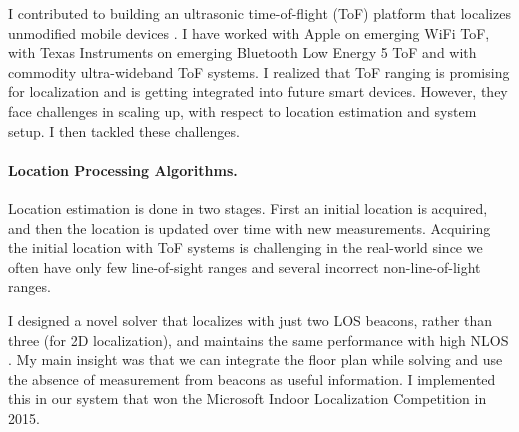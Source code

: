 \documentclass[10pt]{article}
\begin{document}
I contributed to building an ultrasonic time-of-flight (ToF) platform that localizes unmodified mobile devices \cite{rtas-alps-platform, lazik2015alps,lazik2015alpsdemo}.  I have worked with Apple on emerging WiFi ToF, with Texas Instruments on emerging Bluetooth Low Energy 5 ToF and with commodity ultra-wideband ToF systems. I realized that ToF ranging is promising for localization and is getting integrated into future smart devices.  However, they face challenges in scaling up, with respect to location estimation and system setup. I then tackled these challenges. %

\paragraph{Location Processing Algorithms.  } 
Location estimation is done in two stages. First an initial location is acquired, and then the location is updated over time with new measurements. 
Acquiring the initial location with ToF systems is challenging in the real-world since we often have only few line-of-sight ranges and several incorrect non-line-of-light ranges. 

I designed a novel solver that localizes with just two LOS beacons, rather than three (for 2D localization), and maintains the same performance with high NLOS \cite{rajagopal2018enhancing}.  %
My main insight was that we can integrate the floor plan while solving and use the absence of measurement from beacons as useful information. 
I implemented this in our system that won the Microsoft Indoor Localization Competition in 2015. %
\end{document}
